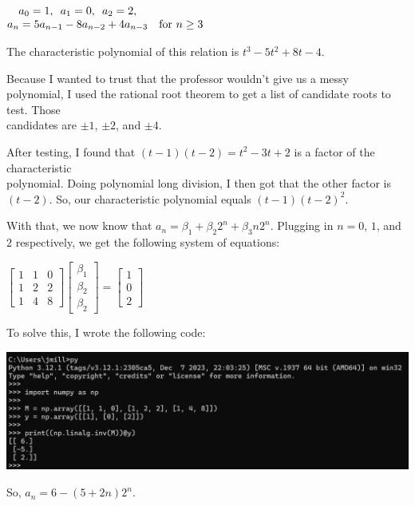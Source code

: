 \documentclass{book}
\newcommand{\exOne}{%
   \color{Purple}%
   \fontsize{13}{15}\selectfont%
}
\newenvironment{myIndent}{%
   \begin{adjustwidth}{2.5em}{0em}%
}{%
   \end{adjustwidth}%
}
\newcommand{\myHS}{ \hspace{0.5em}}
\newcommand{\retTwo}{\hfill\bigbreak}
\begin{document}
{\centering 
$\begin{matrix}
   a_0 = 1,\myHS a_1 = 0,\myHS a_2 = 2,\\
   a_n = 5a_{n-1} - 8a_{n-2} + 4a_{n-3} & \text{for } n \geq 3
\end{matrix}$ \retTwo\par}

\begin{myIndent}\exOne
   The characteristic polynomial of this relation is $t^3 - 5t^2 + 8t - 4$.\retTwo

   Because I wanted to trust that the professor wouldn't give us a messy polynomial, I used the rational root theorem to get a list of candidate roots to test. Those\\ candidates are $\pm 1$, $\pm 2$, and $\pm 4$.\retTwo

   After testing, I found that $(t - 1)(t - 2) = t^2 - 3t + 2$ is a factor of the characteristic\\ polynomial. Doing polynomial long division, I then got that the other factor is\\ $(t - 2)$. So, our characteristic polynomial equals $(t - 1)(t - 2)^2$.\retTwo

   With that, we now know that $a_n = \beta_1 + \beta_2 2^n + \beta_3 n 2^n$. Plugging in $n = 0$, $1$, and $2$ respectively, we get the following system of equations:
   
   {\center $
   \begin{bmatrix}
      1 & 1 & 0 \\ 1 & 2 & 2 \\ 1 & 4 & 8
   \end{bmatrix}
   \begin{bmatrix}
      \beta_1 \\ \beta_2 \\ \beta_2
   \end{bmatrix} = 
   \begin{bmatrix}
      1 \\ 0 \\ 2
   \end{bmatrix}$ \retTwo\par}

   To solve this, I wrote the following code:

   {\centering\includegraphics[scale=0.6]{188-HW1_Q1.png}\retTwo\par}

   So, $a_n = 6 - (5 + 2n)2^n$.\retTwo
\end{myIndent}
\end{document}
